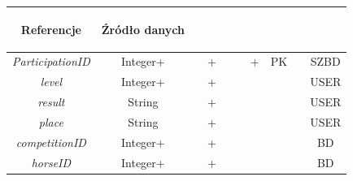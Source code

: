 \documentclass[12pt,oneside]{report}
\begin{document}
\begin{enumerate}[start=10,label={\bfseries REL\textbackslash\arabic*}]
\begin{table}[H]
\begin{tabular}{|c|c|c|c|c|c|c|c|c|c|}
			\begin{sideways}Referencje \end{sideways}&
			\begin{sideways}Źródło danych\end{sideways}\\
			\hline			
			\textit{ParticipationID}&Integer+&&+&&&+&PK&&SZBD\\	
			\hline			
			\textit{level}&Integer+&&+&&&&&&USER\\	
			\hline			
			\textit{result}&String&&+&&&&&&USER\\	
			\hline			
			\textit{place}&String&&+&&&&&&USER\\	
			\hline			
			\textit{competitionID}&Integer+&&+&&&&&&BD\\	
			\hline
			\textit{horseID}&Integer+&&+&&&&&&BD\\	
			\hline
		\end{tabular}
	\end{table}
	

\end{enumerate}
\end{document}

